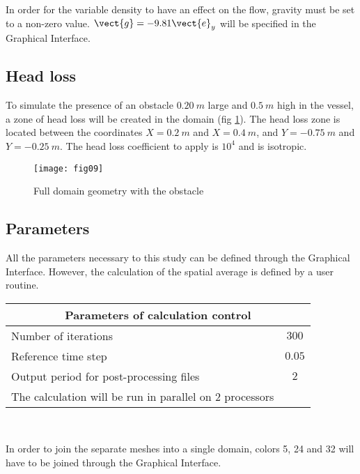 In order for the variable density to have an effect on the flow, gravity must be
set to a non-zero value. $\vect{g} = -9.81 \vect{e}_y$ will be specified in the
Graphical Interface.


        \subsection{Head loss}

To simulate the presence of an obstacle $0.20\ m$ large and $0.5\ m$ high in the
vessel, a zone of head loss will be created in the domain (fig \ref{figante41}).
The head loss zone is located between the coordinates $X=0.2\ m$ and $X=0.4\ m$,
and $Y=-0.75\ m$ and $Y=-0.25\ m$. The head loss coefficient to apply is $10^4$
and is isotropic.

\begin{figure}[h!]
\begin{center}
\texttt{[image: fig09]}
\caption{Full domain geometry with the obstacle}
\label{figante41}
\end{center}
\end{figure}


        \subsection{Parameters}

All the parameters necessary to this study can be defined through the Graphical
Interface. However, the calculation of the spatial average is defined by a user routine.


\begin{center}
\begin{tabular}{|l|c|}
\hline
\multicolumn{2}{|c|}{Parameters of calculation control} \\
\hline
Number of iterations & $300$ \\
\hline
Reference time step & $0.05$ \\
\hline
Output period for post-processing files& $2$ \\
\hline
The calculation will be run in parallel on 2 processors \\
\end{tabular}\\
\end{center}

In order to join the separate meshes into a single domain, colors 5, 24 and 32
will have to be joined through the Graphical Interface.


